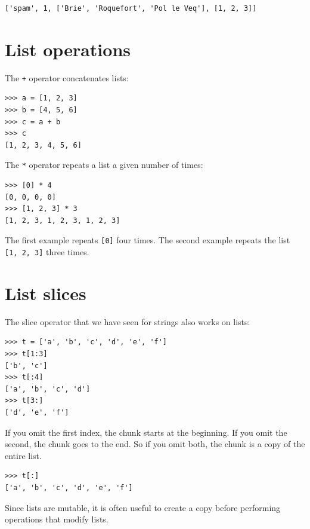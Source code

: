 \begin{Verbatim}[frame=single]
['spam', 1, ['Brie', 'Roquefort', 'Pol le Veq'], [1, 2, 3]]
\end{Verbatim}



\section{List operations}

The \texttt{+} operator concatenates lists:

\begin{Verbatim}[frame=single]
>>> a = [1, 2, 3]
>>> b = [4, 5, 6]
>>> c = a + b
>>> c
[1, 2, 3, 4, 5, 6]
\end{Verbatim}
%
The \texttt{*} operator repeats a list a given number of times:

\begin{Verbatim}[frame=single]
>>> [0] * 4
[0, 0, 0, 0]
>>> [1, 2, 3] * 3
[1, 2, 3, 1, 2, 3, 1, 2, 3]
\end{Verbatim}
%
The first example repeats \texttt{[0]} four times. The second example repeats the list \texttt{[1, 2, 3]} three times.


\section{List slices}

The slice operator that we have seen for strings also works on lists:

\begin{Verbatim}[frame=single]
>>> t = ['a', 'b', 'c', 'd', 'e', 'f']
>>> t[1:3]
['b', 'c']
>>> t[:4]
['a', 'b', 'c', 'd']
>>> t[3:]
['d', 'e', 'f']
\end{Verbatim}
%
If you omit the first index, the chunk starts at the beginning. If you omit the second, the chunk goes to the end. So if you omit both, the chunk is a copy of the entire list.

\begin{Verbatim}[frame=single]
>>> t[:]
['a', 'b', 'c', 'd', 'e', 'f']
\end{Verbatim}
%
Since lists are mutable, it is often useful to create a copy before performing operations that modify lists.

